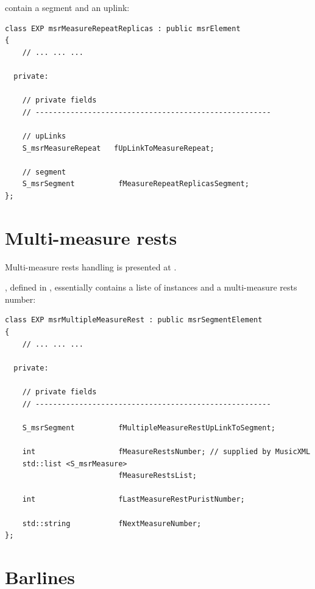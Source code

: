  contain a segment and an uplink:
\begin{lstlisting}[language=CPlusPlus]
class EXP msrMeasureRepeatReplicas : public msrElement
{
	// ... ... ...

  private:

    // private fields
    // ------------------------------------------------------

    // upLinks
    S_msrMeasureRepeat   fUpLinkToMeasureRepeat;

    // segment
    S_msrSegment          fMeasureRepeatReplicasSegment;
};
\end{lstlisting}


\section{Multi-measure rests}\label{Multi-measure rests}

Multi-measure rests handling is presented at .

, defined in , essentially contains a liste of  instances and a multi-measure rests number:
\begin{lstlisting}[language=CPlusPlus]
class EXP msrMultipleMeasureRest : public msrSegmentElement
{
	// ... ... ...

  private:

    // private fields
    // ------------------------------------------------------

    S_msrSegment          fMultipleMeasureRestUpLinkToSegment;

    int                   fMeasureRestsNumber; // supplied by MusicXML
    std::list <S_msrMeasure>
                          fMeasureRestsList;

    int                   fLastMeasureRestPuristNumber;

    std::string           fNextMeasureNumber;
};
\end{lstlisting}


\section{Barlines}\label{Barlines}


